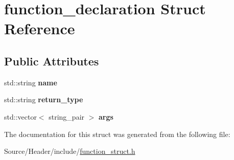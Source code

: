 \hypertarget{structfunction__declaration}{}\section{function\+\_\+declaration Struct Reference}
\label{structfunction__declaration}
\subsection*{Public Attributes}
\begin{DoxyCompactItemize}
\item 
std\+::string {\bfseries name}\hypertarget{structfunction__declaration_a021e9860ca12c3e2835cb21fb4677530}{}\label{structfunction__declaration_a021e9860ca12c3e2835cb21fb4677530}

\item 
std\+::string {\bfseries return\+\_\+type}\hypertarget{structfunction__declaration_ae295213d638ea6572a89ccae425476b2}{}\label{structfunction__declaration_ae295213d638ea6572a89ccae425476b2}

\item 
std\+::vector$<$ string\+\_\+pair $>$ {\bfseries args}\hypertarget{structfunction__declaration_a3e63bb2cf2ed0dd5089fffb8bdee043e}{}\label{structfunction__declaration_a3e63bb2cf2ed0dd5089fffb8bdee043e}

\end{DoxyCompactItemize}


The documentation for this struct was generated from the following file\+:\begin{DoxyCompactItemize}
\item 
Source/\+Header/include/\hyperlink{function__struct_8h}{function\+\_\+struct.\+h}\end{DoxyCompactItemize}
